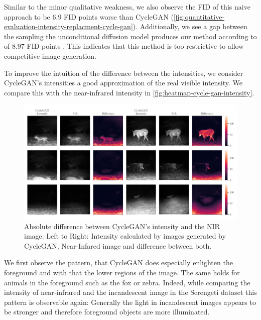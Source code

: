 Similar to the minor qualitative weakness, we also observe the FID of this naive approach to be $6.9$ FID points worse than CycleGAN (\autoref{fig:quantitative-evaluation-intensity-replacment-cycle-gan}).
Additionally, we see a gap between the sampling the unconditional diffusion model produces our method according to  of $8.97$ FID points \parencite{sbgm}.
This indicates that this method is too restrictive to allow competitive image generation.



To improve the intuition of the difference between the intensities, we consider CycleGAN's intensities a good approximation of the real visible intensity.
We compare this with the near-infrared intensity in \autoref{fig:heatmap-cycle-gan-intensity}.

\begin{figure}[htp!]
    \centering
    \includegraphics[width=\textwidth]{gfx/heatmap-nir-cycle-gan-intensity-diff.pdf}
    \caption{
        Absolute difference between CycleGAN's intensity and the NIR image.
        Left to Right: Intensity calculated by images generated by CycleGAN, Near-Infared image \parencite{serengeti} and difference between both.
    }
    \label{fig:heatmap-cycle-gan-intensity}
\end{figure}

We first observe the pattern, that CycleGAN does especially enlighten the foreground and with that the lower regions of the image.
The same holds for animals in the foreground such as the fox or zebra.
Indeed, while comparing the intensity of near-infrared and the incandescent image in the Serengeti dataset \parencite{serengeti}
this pattern is observable again:
Generally the light in incandescent images appears to be stronger and therefore foreground objects are more illuminated.

